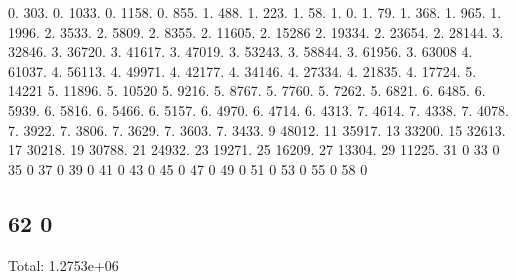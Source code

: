 0. 303. 0. 1033. 0. 1158. 0. 855. 1. 488. 1. 223. 1. 58. 1. 0. 1. 79. 1. 368. 1. 965. 1. 1996. 2. 3533. 2. 5809. 2. 8355. 2. 11605. 2. 15286 2. 19334. 2. 23654. 2. 28144. 3. 32846. 3. 36720. 3. 41617. 3. 47019. 3. 53243. 3. 58844. 3. 61956. 3. 63008 4. 61037. 4. 56113. 4. 49971. 4. 42177. 4. 34146. 4. 27334. 4. 21835. 4. 17724. 5. 14221 5. 11896. 5. 10520 5. 9216. 5. 8767. 5. 7760. 5. 7262. 5. 6821. 6. 6485. 6. 5939. 6. 5816. 6. 5466. 6. 5157. 6. 4970. 6. 4714. 6. 4313. 7. 4614. 7. 4338. 7. 4078. 7. 3922. 7. 3806. 7. 3629. 7. 3603. 7. 3433. 9 48012. 11 35917. 13 33200. 15 32613. 17 30218. 19 30788. 21 24932. 23 19271. 25 16209. 27 13304. 29 11225. 31 0 33 0 35 0 37 0 39 0 41 0 43 0 45 0 47 0 49 0 51 0 53 0 55 0 58 0 \subsection*{62 0 }

Total\+: 1.\+2753e+06 